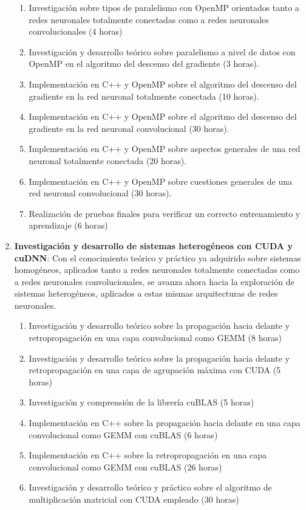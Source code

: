 \begin{enumerate}[label=\textbullet]
\begin{enumerate}[label=\textbullet]
		\item Investigación sobre tipos de paralelismo con OpenMP orientados tanto a redes neuronales totalmente conectadas como a redes neuronales convolucionales (4 horas)
		\item Investigación y desarrollo teórico sobre paralelismo a nivel de datos con OpenMP en el algoritmo del descenso del gradiente (3 horas).
		\item Implementación en C++ y OpenMP sobre el algoritmo del descenso del gradiente en la red neuronal totalmente conectada (10 horas).
		\item Implementación en C++ y OpenMP sobre el algoritmo del descenso del gradiente en la red neuronal convolucional (30 horas).
		\item Implementación en C++ y OpenMP sobre aspectos generales de una red neuronal totalmente conectada (20 horas).
		\item Implementación en C++ y OpenMP sobre cuestiones generales de una red neuronal convolucional (30 horas).
		\item Realización de pruebas finales para verificar un correcto entrenamiento y aprendizaje (6 horas)
	\end{enumerate}
	\item \textbf{Investigación y desarrollo de sistemas heterogéneos con CUDA y cuDNN}:
	Con el conocimiento teórico y práctico ya adquirido sobre sistemas homogéneos, aplicados tanto a redes neuronales totalmente conectadas como a redes neuronales convolucionales, se avanza ahora hacia la exploración de sistemas heterogéneos, aplicados a estas mismas arquitecturas de redes neuronales.
	\begin{enumerate}[label=\textbullet]
		\item Investigación y desarrollo teórico sobre la propagación hacia delante y retropropagación en una capa convolucional como GEMM (8 horas)
		\item Investigación y desarrollo teórico sobre la propagación hacia delante y retropropagación en una capa de agrupación máxima con CUDA (5 horas)
		\item Investigación y comprensión de la librería cuBLAS (5 horas)
		\item Implementación en C++ sobre la propagación hacia delante en una capa convolucional como GEMM con cuBLAS (6 horas)
		\item Implementación en C++ sobre la retropropagación en una capa convolucional como GEMM con cuBLAS (26 horas)
		\item Investigación y desarrollo teórico y práctico sobre el algoritmo de multiplicación matricial con CUDA empleado (30 horas)

\end{enumerate}
\end{enumerate}
